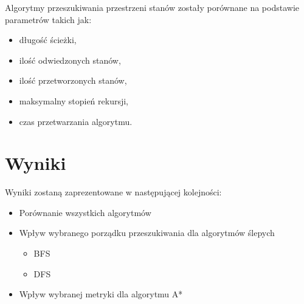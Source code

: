 \documentclass{classrep}
\begin{document}
Algorytmy przeszukiwania przestrzeni stanów zostały porównane na podstawie parametrów takich jak:
\begin{itemize}
  \item długość ścieżki,
  \item ilość odwiedzonych stanów,
  \item ilość przetworzonych stanów,
  \item maksymalny stopień rekursji,
  \item czas przetwarzania algorytmu.
\end{itemize}

\section{Wyniki}

Wyniki zostaną zaprezentowane w następującej kolejności:
\begin{itemize}
  \item Porównanie wszystkich algorytmów
  \item Wpływ wybranego porządku przeszukiwania dla algorytmów ślepych
    \begin{itemize}
      \item BFS
      \item DFS
    \end{itemize}
  \item Wpływ wybranej metryki dla algorytmu A*
\end{itemize}
\end{document}
